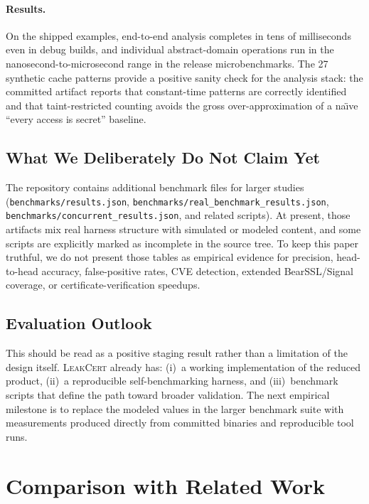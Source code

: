 \documentclass{article}
\theoremstyle{definition}
\theoremstyle{remark}
\begin{document}
\paragraph{Results.}
On the shipped examples, end-to-end analysis completes in tens of milliseconds
even in debug builds, and individual abstract-domain operations run in the
nanosecond-to-microsecond range in the release microbenchmarks. The 27
synthetic cache patterns provide a positive sanity check for the analysis stack:
the committed artifact reports that constant-time patterns are correctly
identified and that taint-restricted counting avoids the gross
over-approximation of a na\"{\i}ve ``every access is secret'' baseline.

\subsection{What We Deliberately Do Not Claim Yet}

The repository contains additional benchmark files for larger studies
(\texttt{benchmarks/results.json}, \texttt{benchmarks/real\_benchmark\_results.json},
\texttt{benchmarks/concurrent\_results.json}, and related scripts). At present,
those artifacts mix real harness structure with simulated or modeled content,
and some scripts are explicitly marked as incomplete in the source tree. To
keep this paper truthful, we do not present those tables as empirical evidence
for precision, head-to-head accuracy, false-positive rates, CVE detection,
extended BearSSL/Signal coverage, or certificate-verification speedups.

\subsection{Evaluation Outlook}

This should be read as a positive staging result rather than a limitation of
the design itself. \textsc{LeakCert} already has: (i)~a working implementation
of the reduced product, (ii)~a reproducible self-benchmarking harness,
and (iii)~benchmark scripts that define the path toward broader validation.
The next empirical milestone is to replace the modeled values in the larger
benchmark suite with measurements produced directly from committed binaries and
reproducible tool runs.

\section{Comparison with Related Work}
\label{sec:related}
\end{document}
